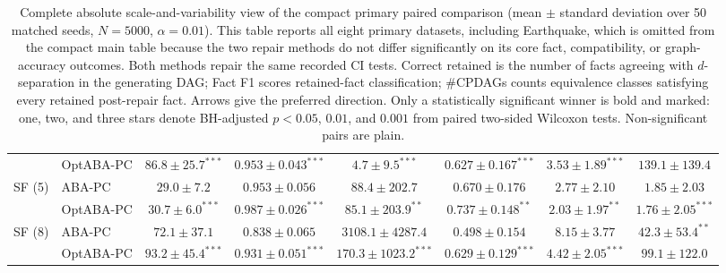 \begin{table}[t]
{\begin{tabular}{llcccccc}
 & OptABA-PC & $\mathbf{86.8\pm25.7}^{***}$ & $\mathbf{0.953\pm0.043}^{***}$ & $\mathbf{4.7\pm9.5}^{***}$ & $\mathbf{0.627\pm0.167}^{***}$ & $\mathbf{3.53\pm1.89}^{***}$ & $139.1\pm139.4$\\
\addlinespace[1pt]
SF (5) & ABA-PC & $29.0\pm7.2$ & $0.953\pm0.056$ & $88.4\pm202.7$ & $0.670\pm0.176$ & $2.77\pm2.10$ & $1.85\pm2.03$\\
 & OptABA-PC & $\mathbf{30.7\pm6.0}^{***}$ & $\mathbf{0.987\pm0.026}^{***}$ & $\mathbf{85.1\pm203.9}^{**}$ & $\mathbf{0.737\pm0.148}^{**}$ & $\mathbf{2.03\pm1.97}^{**}$ & $\mathbf{1.76\pm2.05}^{***}$\\
\addlinespace[1pt]
SF (8) & ABA-PC & $72.1\pm37.1$ & $0.838\pm0.065$ & $3108.1\pm4287.4$ & $0.498\pm0.154$ & $8.15\pm3.77$ & $\mathbf{42.3\pm53.4}^{**}$\\
 & OptABA-PC & $\mathbf{93.2\pm45.4}^{***}$ & $\mathbf{0.931\pm0.051}^{***}$ & $\mathbf{170.3\pm1023.2}^{***}$ & $\mathbf{0.629\pm0.129}^{***}$ & $\mathbf{4.42\pm2.05}^{***}$ & $99.1\pm122.0$\\
\bottomrule
\end{tabular}
}%
\caption{Complete absolute scale-and-variability view of the compact primary paired comparison (mean $\pm$ standard deviation over 50 matched seeds, $N=5000$, $\alpha=0.01$). This table reports all eight primary datasets, including Earthquake, which is omitted from the compact main table because the two repair methods do not differ significantly on its core fact, compatibility, or graph-accuracy outcomes. Both methods repair the same recorded CI tests. Correct retained is the number of facts agreeing with $d$-separation in the generating DAG; Fact F1 scores retained-fact classification; \#CPDAGs counts equivalence classes satisfying every retained post-repair fact. Arrows give the preferred direction. Only a statistically significant winner is bold and marked: one, two, and three stars denote BH-adjusted $p<0.05$, $0.01$, and $0.001$ from paired two-sided Wilcoxon tests. Non-significant pairs are plain.}
\label{tab:absolute-results}
\end{table}
